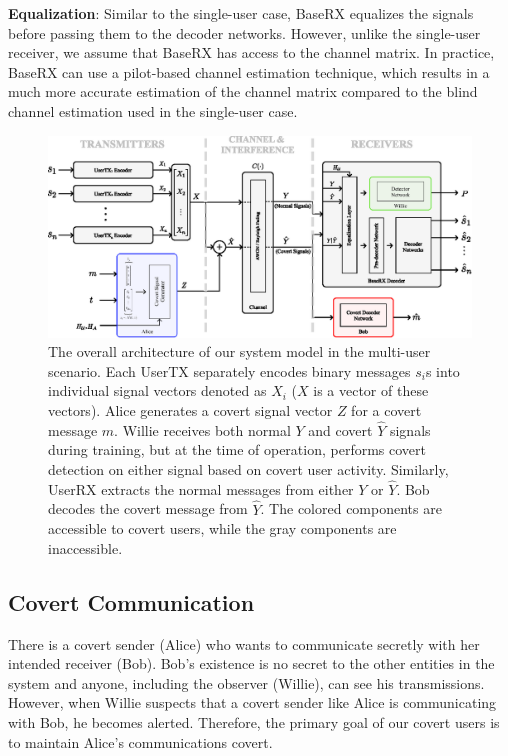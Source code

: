 \textbf{Equalization}: Similar to the single-user case, BaseRX equalizes the signals before passing them to the decoder networks. However, unlike the single-user receiver, we assume that BaseRX has access to the channel matrix. In practice, BaseRX can use a pilot-based channel estimation technique, which results in a much more accurate estimation of the channel matrix compared to the blind channel estimation used in the single-user case.

\begin{figure}[thp]
	\center
	\includegraphics[width=.7\linewidth]{figs/multi_system_architecture}
	\caption{The overall architecture of our system model in the multi-user scenario. Each UserTX separately encodes binary messages $s_i$s into individual signal vectors denoted as $X_i$ ($X$ is a vector of these vectors). Alice generates a covert signal vector $Z$ for a covert message $m$. Willie receives both normal $Y$ and covert $\hat{Y}$ signals during training, but at the time of operation, performs covert detection on either signal based on covert user activity. Similarly, UserRX extracts the normal messages from either $Y$ or $\hat{Y}$. Bob decodes the covert message from $\hat{Y}$. The colored components are accessible to covert users, while the gray components are inaccessible.}
	\label{fig:multi_system_architecture}
\end{figure}

\subsection{Covert Communication}
There is a covert sender (Alice) who wants to communicate secretly with her intended receiver (Bob). Bob's existence is no secret to the other entities in the system and anyone, including the observer (Willie), can see his transmissions. However, when Willie suspects that a covert sender like Alice is communicating with Bob, he becomes alerted. Therefore, the primary goal of our covert users is to maintain Alice's communications covert.

